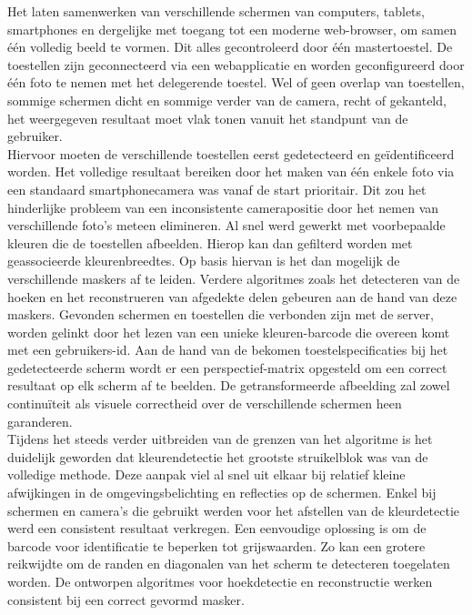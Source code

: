 Het laten samenwerken van verschillende schermen van computers, tablets, smartphones en dergelijke met toegang tot een moderne web-browser, om samen één volledig beeld te vormen. Dit alles gecontroleerd door één mastertoestel. De toestellen zijn geconnecteerd via een webapplicatie en worden geconfigureerd door één foto te nemen met het delegerende toestel. Wel of geen overlap van toestellen, sommige schermen dicht en sommige verder van de camera, recht of gekanteld, het weergegeven resultaat moet vlak tonen vanuit het standpunt van de gebruiker.\\[3mm]
Hiervoor moeten de verschillende toestellen eerst gedetecteerd en geïdentificeerd worden. Het volledige resultaat bereiken door het maken van één enkele foto via een standaard smartphonecamera was vanaf de start prioritair. Dit zou het hinderlijke probleem van een inconsistente camerapositie door het nemen van verschillende foto’s meteen elimineren. Al snel werd gewerkt met voorbepaalde kleuren die de toestellen afbeelden. Hierop kan dan gefilterd worden met geassocieerde kleurenbreedtes. Op basis hiervan is het dan mogelijk de verschillende maskers af te leiden. Verdere algoritmes zoals het detecteren van de hoeken en het reconstrueren van afgedekte delen gebeuren aan de hand van deze maskers. Gevonden schermen en toestellen die verbonden zijn met de server, worden gelinkt door het lezen van een unieke kleuren-barcode die overeen komt met een gebruikers-id. Aan de hand van de bekomen toestelspecificaties bij  het gedetecteerde scherm wordt er een perspectief-matrix opgesteld om een correct resultaat op elk scherm af te beelden. De getransformeerde afbeelding zal zowel continuïteit als visuele correctheid over de verschillende schermen heen garanderen.\\[3mm]
Tijdens het steeds verder uitbreiden van de grenzen van het algoritme is het duidelijk geworden dat kleurendetectie het grootste struikelblok was van de volledige methode. Deze aanpak viel al snel uit elkaar bij relatief kleine afwijkingen in de omgevingsbelichting en reflecties op de schermen. Enkel bij schermen en camera’s die gebruikt werden voor het afstellen van de kleurdetectie werd een consistent resultaat verkregen. Een eenvoudige oplossing is om de barcode voor identificatie te beperken tot grijswaarden. Zo kan een grotere reikwijdte om de randen en diagonalen van het scherm te detecteren toegelaten worden. De ontworpen algoritmes voor hoekdetectie en reconstructie werken consistent bij een correct gevormd masker.
